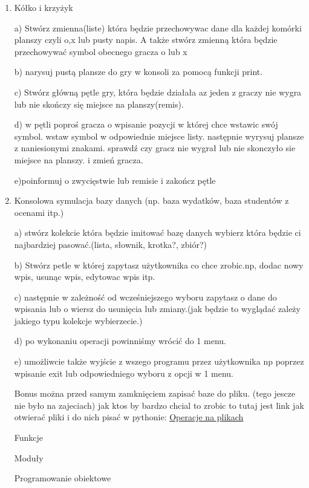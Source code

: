 \documentclass[11pt]{article}
\begin{document}
\begin{enumerate}
\item 
\begin{Large}
	Kółko i krzyżyk
\end{Large}
\par
a) Stwórz zmienna(liste) która będzie przechowywac dane dla każdej komórki planszy czyli o,x lub pusty napis. A także stwórz zmienną która będzie przechowywać symbol obecnego gracza o lub x
\par
b) narysuj pustą plansze do gry w konsoli za pomocą funkcji print.
\par
c) Stwórz główną pętle gry, która będzie działała az jeden z graczy nie wygra lub nie skończy się miejsce na planszy(remis).
\par
d) w pętli poproś gracza o wpisanie pozycji w której chce wstawic swój symbol. wstaw symbol w odpowiednie miejsce listy. następnie wyrysuj plansze z naniesionymi znakami. sprawdź czy gracz nie wygrał lub nie skonczyło sie miejsce na planszy. i zmień gracza.
\par
e)poinformuj o zwycięstwie lub remisie i zakończ pętle

\item 
\begin{Large}
	Konsolowa symulacja bazy danych (np. baza wydatków, baza studentów z ocenami itp.)
\end{Large}
\par
a) stwórz kolekcie która będzie imitować bazę danych wybierz która będzie ci najbardziej pasować.(lista, słownik, krotka?, zbiór?)
\par
b) Stwórz petle w której zapytasz użytkownika co chce zrobic.np, dodac nowy wpis, usunąc wpis, edytowac wpis itp.
\par
c) następnie w zależność od wcześniejszego wyboru zapytasz o dane do wpisania lub o wiersz do usunięcia lub zmiany.(jak będzie to wyglądać zależy jakiego typu kolekcje wybierzecie.)
\par
d) po wykonaniu operacji powinniśmy wrócić do 1 menu.
\par
e) umożliwcie także wyjście z wszego programu przez użytkownika np poprzez wpisanie exit lub odpowiedniego wyboru z opcji w 1 menu.
\par
Bonus można przed samym zamknięciem zapisać baze do pliku. (tego jescze nie było na zajeciach) jak ktos by bardzo chcial to zrobic to tutaj jest link jak otwierać pliki i do nich pisać w pythonie: \href{http://davinci.mimuw.edu.pl/samouczek-python-python/operacje-na-plikach}{Operacje na plikach}

\medskip
\begin{Large}
	Funkcje
\end{Large}


\medskip
\begin{Large}
	Moduły
\end{Large}

\medskip
\begin{Large}
	Programowanie obiektowe
\end{Large}

\end{enumerate}
	
	
\end{document}
